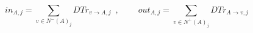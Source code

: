 \begin{definition}
\label{inouttrust}
  \begin{equation}
    in_{A, j} = \sum\limits_{v \in N^{-}\left(A\right)_j}DTr_{v \rightarrow A, j} \enspace, \:\:\:\:\:\:\:\:\:\:
    out_{A, j} = \sum\limits_{v \in N^{+}\left(A\right)_j}DTr_{A \rightarrow v, j}
  \end{equation}
\end{definition}

